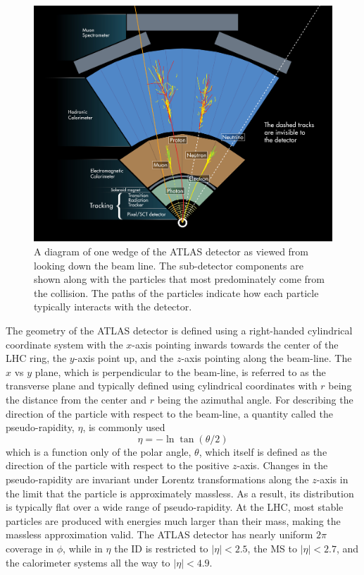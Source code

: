 \begin{figure}[ht!]
\centering
\includegraphics[width=.9\textwidth]{figures/atlas/wedge.jpg}
\caption{A diagram of one wedge of the ATLAS detector
as viewed from looking down the beam line. 
The sub-detector components are shown along with the 
particles that most predominately come from the collision.
The paths of the particles indicate how each particle typically 
interacts with the detector.}
\label{fig:atlas_wedge}
\end{figure}

The geometry of the ATLAS detector is defined using a 
right-handed cylindrical coordinate system with the $x$-axis
pointing inwards towards the center of the LHC ring, the $y$-axis point
up, and the $z$-axis pointing along the beam-line.
The $x$ vs $y$ plane, which is perpendicular to the beam-line,
is referred to as the transverse plane and typically 
defined using cylindrical coordinates with $r$ being the distance
from the center and $r$ being the azimuthal angle.
For describing the direction of the particle with respect 
to the beam-line, a quantity called the pseudo-rapidity, $\eta$, is commonly
used
\begin{equation}
\eta = -\ln \tan (\theta/2) 
\label{eq:pseudorapidity}
\end{equation}
which is a function only of the polar angle, $\theta$, which 
itself is defined
as the direction of the particle with respect to the positive $z$-axis.
Changes in the pseudo-rapidity are 
invariant under Lorentz transformations along
the $z$-axis in the limit that the particle is approximately massless. 
As a result, its distribution is typically flat over
a wide range of pseudo-rapidity. At the LHC, most stable particles 
are produced with energies much larger than their mass, making the 
massless approximation valid.
The ATLAS detector has nearly uniform $2\pi$ coverage in $\phi$,
while in $\eta$ the ID is restricted to $|\eta| < 2.5$,
the MS to $|\eta| < 2.7$, and the calorimeter systems all the way
to $|\eta| < 4.9$.

